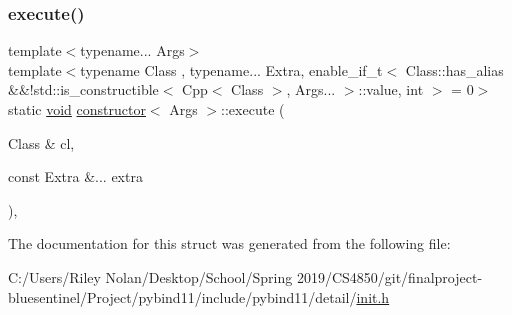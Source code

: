 \mbox{\label{structconstructor_a18005e4a1a32b55cbccf36071f3f62e8}} 
\subsubsection{\texorpdfstring{execute()}{execute()}\hspace{0.1cm}{\footnotesize\ttfamily [3/3]}}
{\footnotesize\ttfamily template$<$typename... Args$>$ \\
template$<$typename Class , typename... Extra, enable\+\_\+if\+\_\+t$<$ Class\+::has\+\_\+alias \&\&!std\+::is\+\_\+constructible$<$ Cpp$<$ Class $>$, Args... $>$\+::value, int $>$  = 0$>$ \\
static \mbox{\hyperlink{_s_d_l__opengles2__gl2ext_8h_ae5d8fa23ad07c48bb609509eae494c95}{void}} \mbox{\hyperlink{structconstructor}{constructor}}$<$ Args $>$\+::execute (\begin{DoxyParamCaption}\item[{Class \&}]{cl,  }\item[{const Extra \&...}]{extra }\end{DoxyParamCaption})\hspace{0.3cm}{\ttfamily [inline]}, {\ttfamily [static]}}



The documentation for this struct was generated from the following file\+:\begin{DoxyCompactItemize}
\item 
C\+:/\+Users/\+Riley Nolan/\+Desktop/\+School/\+Spring 2019/\+C\+S4850/git/finalproject-\/bluesentinel/\+Project/pybind11/include/pybind11/detail/\mbox{\hyperlink{init_8h}{init.\+h}}\end{DoxyCompactItemize}
